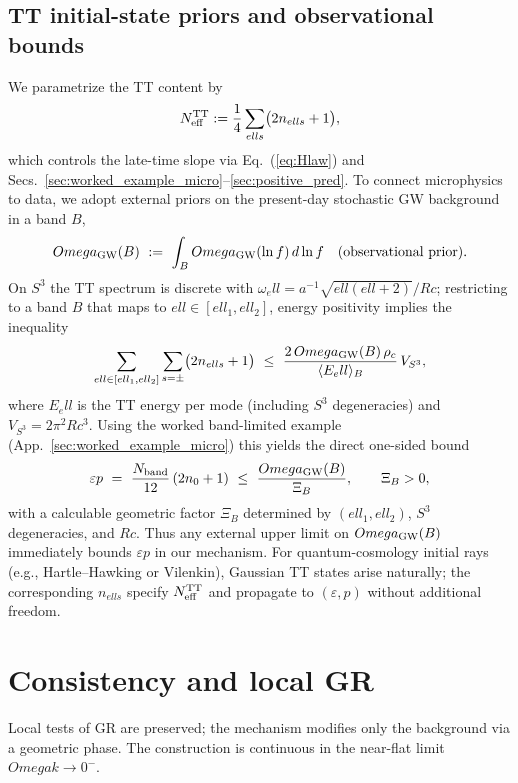 \documentclass[aps,prd,twocolumn,amsmath,amssymb,nofootinbib,superscriptaddress]{revtex4-2}
\def\mathcal#1{#1}%
\def\Rc{Rc}%
\def\Ok{Omega k}%
\def\Omega{Omega}\def\sigma{sigma}\def\chi{chi}\def\ell{ell}%
\newcommand{\Rc}{\mathcal{R}_c}
\newcommand{\Ok}{\Omega_k}
\begin{document}
\subsection{TT initial-state priors and observational bounds}
\label{subsec:TT_priors}
We parametrize the TT content by
\[
\mathcal N_{\rm eff}^{\rm TT}:=\frac{1}{4}\sum_{\ell s}\bigl(2n_{\ell s}+1\bigr),
\]
which controls the late-time slope via Eq.~(\ref{eq:Hlaw}) and Secs.~\ref{sec:worked_example_micro}--\ref{sec:positive_pred}.
To connect microphysics to data, we adopt external priors on the present-day stochastic GW background in a band $B$,
\[
\Omega_{\rm GW}(B)\ :=\ \int_{B}\Omega_{\rm GW}(\ln f)\,d\ln f\ \ \ \text{(observational prior)}.
\]
On $S^3$ the TT spectrum is discrete with $\omega_\ell=a^{-1}\sqrt{\ell(\ell+2)}/\Rc$; restricting to a band $B$ that maps to $\ell\in[\ell_1,\ell_2]$, energy positivity implies the inequality
\begin{equation}
\sum_{\ell\in[\ell_1,\ell_2]}\sum_{s=\pm}\bigl(2n_{\ell s}+1\bigr)
\ \le\ \frac{2\,\Omega_{\rm GW}(B)\,\rho_c}{\langle \mathcal E_\ell \rangle_B}\,V_{S^3},
\label{eq:TTbound_general}
\end{equation}
where $\mathcal E_\ell$ is the TT energy per mode (including $S^3$ degeneracies) and $V_{S^3}=2\pi^2\Rc^3$.
Using the worked band-limited example (App.~\ref{sec:worked_example_micro}) this yields the direct one-sided bound
\begin{equation}
\varepsilon p\ =\ \frac{N_{\rm band}}{12}\,(2n_0+1)\ \le\ \frac{\Omega_{\rm GW}(B)}{\Xi_B},
\qquad
\Xi_B>0,
\end{equation}
with a calculable geometric factor $\Xi_B$ determined by $(\ell_1,\ell_2)$, $S^3$ degeneracies, and $\Rc$.
Thus any external upper limit on $\Omega_{\rm GW}(B)$ immediately bounds $\varepsilon p$ in our mechanism.
For quantum-cosmology initial rays (e.g., Hartle--Hawking or Vilenkin), Gaussian TT states arise naturally; the corresponding $n_{\ell s}$ specify $\mathcal N_{\rm eff}^{\rm TT}$ and propagate to $(\varepsilon,p)$ without additional freedom.

\section{Consistency and local GR}
Local tests of GR are preserved; the mechanism modifies only the background via a geometric phase. The construction is continuous in the near-flat limit $\Ok\to 0^{-}$.
\end{document}
